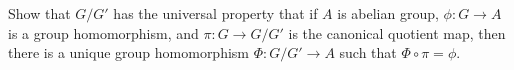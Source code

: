 \begin{exercise}
    Show that $G/G'$ has the universal property that if $A$ is abelian 
    group, $\phi : G \to A$ is a group homomorphism, and $\pi 
    : G \to G/G'$ is the canonical quotient map, then there is a 
    unique group homomorphism $\Phi : G/G' \to A$ such that 
    $\Phi \circ \pi = \phi$. 

    \begin{center}
    \end{center}
\end{exercise}

